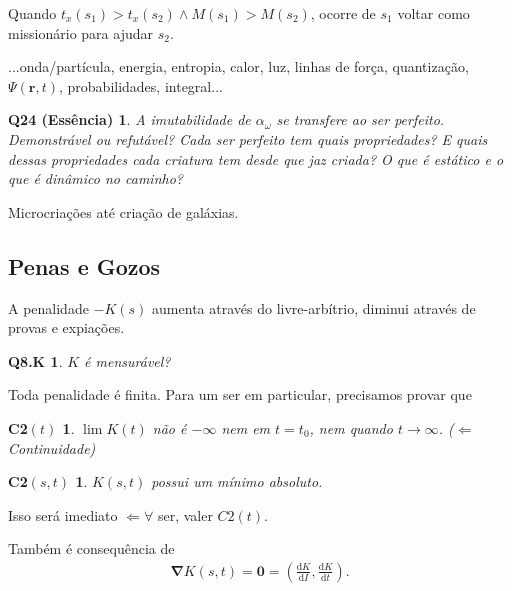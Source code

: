 \documentclass[12pt,a4paper]{article}
\begin{document}
			Quando $t_x(s_1) > t_x(s_2) \wedge M(s_1) > M(s_2)$, ocorre de $s_1$ voltar como mission\'ario para ajudar $s_2$.

			...onda/part\'icula, energia, entropia, calor, luz, linhas de for\c{c}a, quantiza\c{c}\~ao, $ \Psi(\mathbf{r}, t) $, probabilidades, integral...

			\newtheorem{Q24}{Q24 (Ess\^encia)}
			\begin{Q24} A imutabilidade de $ \alpha_\omega $ se transfere ao ser perfeito. Demonstr\'avel ou refut\'avel? Cada ser perfeito tem quais propriedades? E quais dessas propriedades cada criatura tem desde que jaz criada? O que \'e est\'atico e o que \'e din\^amico no caminho?
			\end{Q24}

			Microcria\c{c}\~oes at\'e cria\c{c}\~ao de gal\'axias.

		\subsection{Penas e Gozos}
			\begin{flushright}
			\end{flushright}

			\begin{center}
			\end{center}

			A penalidade $ - K(s) $ aumenta atrav\'es do livre-arb\'itrio, diminui atrav\'es de provas e expia\c{c}\~oes.

			\newtheorem{Q8.K}{Q8.K}
			\begin{Q8.K} $K$ \'e mensur\'avel?
			\end{Q8.K}

			Toda penalidade \'e finita. Para um ser em particular, precisamos provar que

			\newtheorem{C2t}{C2$(t)$}
			\begin{C2t} $ \lim K(t) $ n\~ao \'e $ - \infty $ nem em $ t = t_0 $, nem quando $ t \rightarrow \infty $. ($\Leftarrow$ Continuidade)
			\end{C2t}

			\newtheorem{C2st}{C2$(s,t)$}
			\begin{C2st} $K(s,t)$ possui um m\'inimo absoluto.
			\end{C2st}

			Isso ser\'a imediato $ \Leftarrow \forall $ ser, valer $C2(t)$.

			Tamb\'em \'e consequ\^encia de
			\begin{align*}
				\mathbf{\nabla} K(s,t) = \mathbf{0} = \left(\frac{\mathrm{d}K}{\mathrm{d}I}, \frac{\mathrm{d}K}{\mathrm{d}t}\right).
			\end{align*}
\end{document}
